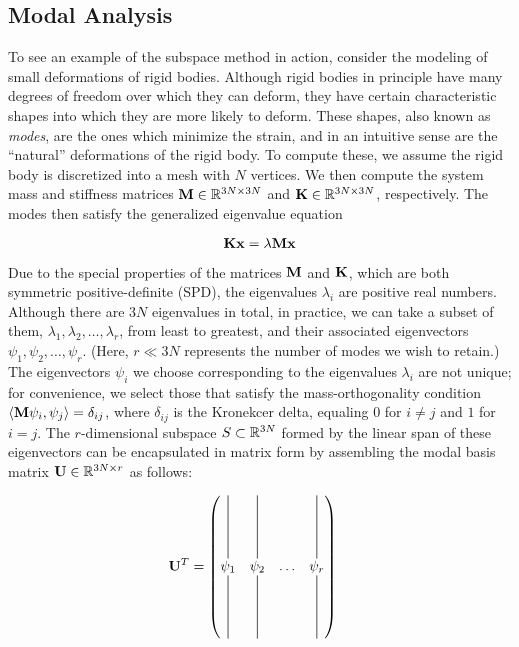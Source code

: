 \subsection{Modal Analysis}
To see an example of the subspace method in action, consider the modeling of small deformations of rigid bodies. Although rigid bodies in principle have many degrees of freedom over which they can deform, they have certain characteristic shapes into which they are more likely to deform. These shapes, also known as {\em modes}, are the ones which minimize the strain, and in an intuitive sense are the ``natural'' deformations of the rigid body. To compute these, we assume the rigid body is discretized into a mesh with $N$ vertices. We then compute the system mass and stiffness matrices $\mathbf{M} \in \mathbb{R}^{3N \times 3N}$ and $\mathbf{K} \in \mathbb{R}^{3N \times 3N}$, respectively. The modes then satisfy the generalized eigenvalue equation

\begin{equation}
	\mathbf{K} \mathbf{x} = \lambda \mathbf{M} \mathbf{x}
\end{equation}

Due to the special properties of the matrices $\mathbf{M}$ and $\mathbf{K}$, which are both symmetric positive-definite (SPD), the eigenvalues $\lambda_i$ are positive real numbers. 
Although there are $3N$ eigenvalues in total, in practice, we can take a subset of them, $\lambda_1, \lambda_2, \dots, \lambda_r$, from least to greatest, and their associated eigenvectors
 $\psi_1, \psi_2, \dots, \psi_r$. (Here, $r \ll 3N$ represents the number of modes we wish to retain.) The eigenvectors $\psi_i$ we choose corresponding to the eigenvalues $\lambda_i$ 
 are not unique; for convenience, we select those that satisfy the mass-orthogonality condition $\langle \mathbf{M} \psi_i, \psi_j \rangle = \delta_{ij}$, where $\delta_{ij}$ is the Kronekcer delta, 
 equaling $0$ for $i \neq j$ and $1$ for $i=j$. The $r$-dimensional subspace $S \subset \mathbb{R}^{3N}$ formed by the linear span of these eigenvectors can be encapsulated in matrix form 
 by assembling the modal basis matrix $\mathbf{U} \in \mathbb{R}^{3N \times r}$ as follows:

\begin{align}
	\UU^{T} &= \begin{pmatrix}
	\vertbar & \vertbar &   & \vertbar \\
	\psi_1 & \psi_2 & \dots & \psi_r   \\
	\vertbar & \vertbar &   & \vertbar
  \end{pmatrix}
\end{align}

